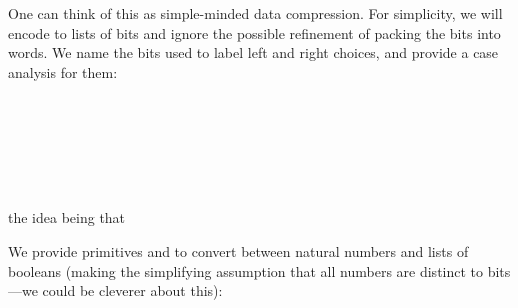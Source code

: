 \documentclass[fleqn,runningheads]{llncs}
\begin{document}
One can think of this as simple-minded data compression. For simplicity, we will encode to lists of bits and ignore the possible refinement of packing the bits into words.
We name the bits used to label left and right choices, and provide a case analysis for them:
\begin{code}%
\>[0]\AgdaSpace{}%
\AgdaSpace{}%
\AgdaSymbol{:}\AgdaSpace{}%
\<%
\\
\>[0]%
\>[10]\AgdaSymbol{=}\AgdaSpace{}%
\<%
\\
\>[0]%
\>[10]\AgdaSymbol{=}\AgdaSpace{}%
\<%
\\
%
\\[\AgdaEmptyExtraSkip]%
\>[0]\AgdaSpace{}%
\AgdaSymbol{:}\AgdaSpace{}%
\AgdaSpace{}%
\AgdaSpace{}%
\AgdaSpace{}%
\AgdaSpace{}%
\AgdaSpace{}%
\AgdaSpace{}%
\<%
\\
\>[0]\AgdaSpace{}%
\AgdaSpace{}%
\AgdaSpace{}%
\AgdaSpace{}%
\AgdaSymbol{=}\AgdaSpace{}%
\AgdaSpace{}%
\AgdaSpace{}%
\AgdaSpace{}%
\AgdaSpace{}%
\AgdaSpace{}%
\<%
\end{code}
the idea being that
\begin{quote}%
\AgdaSpace{}%
\AgdaSymbol{=}\AgdaSpace{}%
\AgdaSpace{}%
\AgdaSpace{}%
\AgdaSpace{}%
%
\end{quote}
We provide primitives  and  to convert between natural numbers and lists of booleans (making the simplifying assumption that all numbers are distinct to  bits---we could be cleverer about this):
\end{document}
